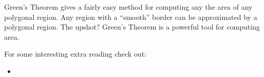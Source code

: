 \documentclass{ximera}
\begin{document}
Green's Theorem gives a fairly easy method for computing any the area
of any polygonal region. Any region with a ``smooth'' border can be approximated by a polygonal region. The upshot? Green's Theorem is a powerful tool for computing area.

For some interesting extra reading check out:
\begin{itemize}
\item {}
\end{itemize}
\end{document}
